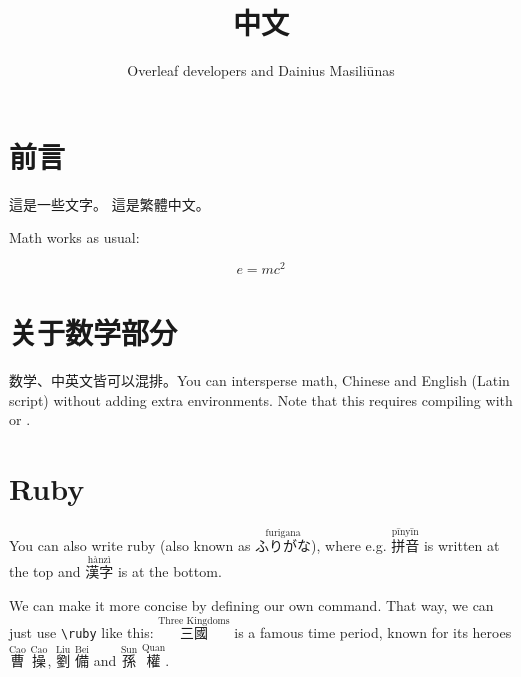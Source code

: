\documentclass{article}
\title{中文}
\author{Overleaf developers and Dainius Masiliūnas}
\begin{document}
\maketitle

\section{前言}
這是一些文字。
這是繁體中文。

Math works as usual:

$$ e = mc^2 $$

\section{关于数学部分}
数学、中英文皆可以混排。You can intersperse math, Chinese and English (Latin script) without adding extra environments. Note that this requires compiling with  or .

\section{Ruby}

You can also write ruby (also known as $\stackrel{\text{furigana}}{\text{ふりがな}}$), where e.g. $\stackrel{\text{pīnyīn}}{\text{拼音}}$ is written at the top and $\stackrel{\text{hànzì}}{\text{漢字}}$ is at the bottom.

We can make it more concise by defining our own command.
\newcommand{\ruby}[2]{\stackrel{\text{#1}}{\text{#2}}}
That way, we can just use \texttt{\textbackslash{ruby}} like this: $\ruby{Three Kingdoms}{三國}$ is a famous time period, known for its heroes $\ruby{Cao}{曹}$ $\ruby{Cao}{操}$, $\ruby{Liu}{劉}$ $\ruby{Bei}{備}$ and $\ruby{Sun}{孫}$ $\ruby{Quan}{權}$.
\end{document}
